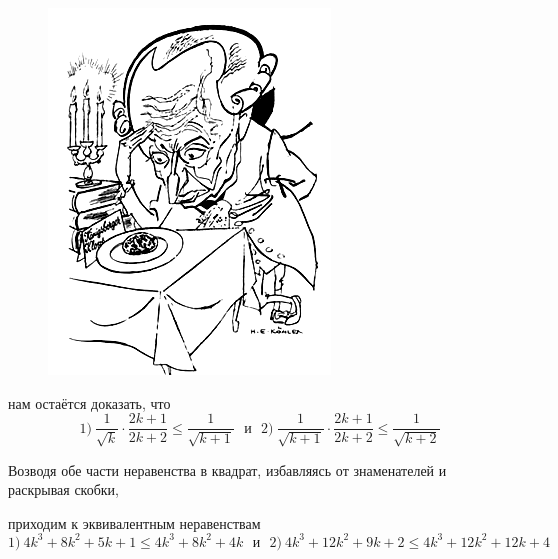 {\begin{figure}[h]
\begin{minipage}{0.74\linewidth}
\end{minipage}
\hfill
\begin{minipage}{0.25\linewidth}
    \includegraphics[width=0.95\columnwidth]{img/euler_k.png}
\end{minipage}
\end{figure}}

\par
нам остаётся доказать, что
\begin{equation*}
1)~\dfrac{1}{\sqrt{k}} \cdot \dfrac{2k + 1}{2k + 2} \leq \dfrac{1}{\sqrt{k + 1}}
   ~~~и~~~    
  2)~\dfrac{1}{\sqrt{k + 1}} \cdot \dfrac{2k + 1}{2k + 2} \leq \dfrac{1}{\sqrt{k + 2}}
\end{equation*}

\par
Возводя обе части неравенства в квадрат, избавляясь от знаменателей и раскрывая скобки, 
\par
приходим к эквивалентным неравенствам
\begin{equation*}
1)~4k^3 + 8k^2 + 5k + 1 \leq 4k^3 + 8k^2 + 4k
 ~~~и~~~
  2)~4k^3 + 12k^2 + 9k + 2 \leq 4k^3 + 12k^2 + 12k + 4
\end{equation*}


